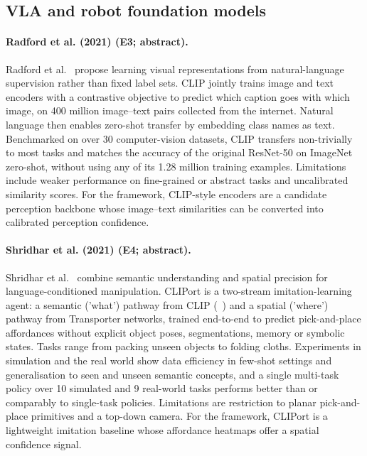 \documentclass[10pt,a4paper]{article}
\begin{document}
\subsection*{VLA and robot foundation models}
\paragraph{Radford et al. (2021) (E3; abstract).} Radford et al.~\cite{Radford2021} propose learning visual representations from natural-language supervision rather than fixed label sets. CLIP jointly trains image and text encoders with a contrastive objective to predict which caption goes with which image, on 400 million image--text pairs collected from the internet. Natural language then enables zero-shot transfer by embedding class names as text. Benchmarked on over 30 computer-vision datasets, CLIP transfers non-trivially to most tasks and matches the accuracy of the original ResNet-50 on ImageNet zero-shot, without using any of its 1.28 million training examples. Limitations include weaker performance on fine-grained or abstract tasks and uncalibrated similarity scores. For the framework, CLIP-style encoders are a candidate perception backbone whose image--text similarities can be converted into calibrated perception confidence.

\paragraph{Shridhar et al. (2021) (E4; abstract).} Shridhar et al.~\cite{Shridhar2021} combine semantic understanding and spatial precision for language-conditioned manipulation. CLIPort is a two-stream imitation-learning agent: a semantic ('what') pathway from CLIP (~\cite{Radford2021}) and a spatial ('where') pathway from Transporter networks, trained end-to-end to predict pick-and-place affordances without explicit object poses, segmentations, memory or symbolic states. Tasks range from packing unseen objects to folding cloths. Experiments in simulation and the real world show data efficiency in few-shot settings and generalisation to seen and unseen semantic concepts, and a single multi-task policy over 10 simulated and 9 real-world tasks performs better than or comparably to single-task policies. Limitations are restriction to planar pick-and-place primitives and a top-down camera. For the framework, CLIPort is a lightweight imitation baseline whose affordance heatmaps offer a spatial confidence signal.
\end{document}
